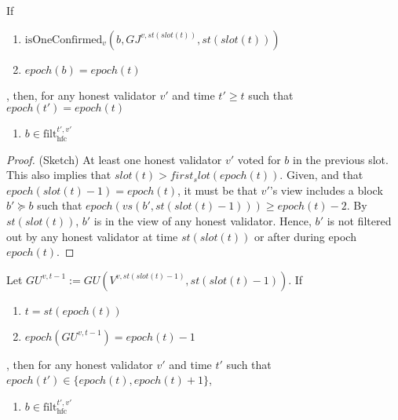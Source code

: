 \documentclass{article}
\begin{document}
\begin{lemma}
    If
    \begin{enumerate}
        \item $\text{isOneConfirmed}_v(b, GJ^{v,st(slot(t))}, st(slot(t)))$
        \item $epoch(b) = epoch(t)$
    \end{enumerate},
    then, for any honest validator $v'$ and time $t' \geq t$ such that $epoch(t') = epoch(t)$
    \begin{enumerate}
        \item $b \in \text{filt}^{t',v'}_{\text{hfc}}$
    \end{enumerate}
\end{lemma}

\begin{proof}(Sketch)
    At least one honest validator $v'$ voted for $b$ in the previous slot.
    This also implies that $slot(t) > first_slot(epoch(t))$. 
    Given,  and that $epoch(slot(t)-1) = epoch(t)$,  it must be that $v'$'s view includes a block $b' \succeq b$ such that $epoch(vs(b', st(slot(t)-1))) \geq epoch(t)-2$.
    By $st(slot(t))$, $b'$ is in the view of any honest validator.
    Hence, $b'$ is not filtered out by any honest validator at time $st(slot(t))$ or after during epoch $epoch(t)$.
\end{proof}

\begin{lemma}
    Let $GU^{v,t-1} := GU(V^{v,st(slot(t)-1)},st(slot(t)-1))$.
    If
    \begin{enumerate}
        \item $t = st(epoch(t))$
        \item $epoch(GU^{v,t-1}) = epoch(t)-1$
    \end{enumerate},
    then for any honest validator $v'$ and time $t'$ such that $epoch(t') \in \{epoch(t),epoch(t)+1\}$,
    \begin{enumerate}
        \item $b \in \text{filt}^{t',v'}_{\text{hfc}}$
    \end{enumerate}
\end{lemma}
\end{document}
